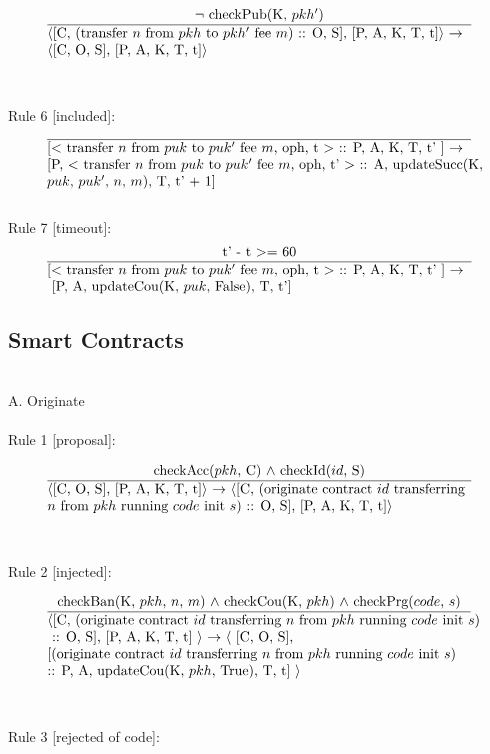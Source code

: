 \documentclass[a4paper]{llncs}
\begin{document}
\begin{equation}{}
\frac{\text{$\neg$ checkPub(K, $pkh'$)}}{\parbox{4.2in}{\text{$\langle$[C, (transfer $n$ from $pkh$ to $pkh'$ fee $m$) :: O, S], [P, A, K, T, t]$\rangle$ $\rightarrow$ }\\
\text{$\langle$[C, O, S], [P, A, K, T, t]$\rangle$}}} 
\end{equation}
\\
\\
Rule 6 [included]:
\begin{equation}{}
\frac{}{\parbox{4.2in}{\text{[$<$ transfer $n$ from $puk$ to  $puk'$ fee $m$, oph, t $>$ :: P, A, K, T, t' ] $\rightarrow$ } \\
 \text{[P, $<$ transfer $n$ from  $puk$ to $puk'$ fee $m$, oph, t' $>$ :: A, updateSucc(K, } \\
\text{$puk$, $puk'$, $n$, $m$), T, t' + 1]}}} 
\end{equation}
\\
Rule 7 [timeout]:
\begin{equation}{}
\frac{\text{t' - t $>=$ 60}}{\parbox{4.2in}{\text{[$<$ transfer $n$ from $puk$ to  $puk'$ fee $m$, oph, t $>$ :: P, A, K, T, t' ] $\rightarrow$} \\
 \hspace*{0cm} \text{[P, A, updateCou(K, $puk$, False), T, t']}}} 
\end{equation}

\subsection{Smart Contracts}
\\
A. Originate
\\
\\
Rule 1 [proposal]:

\begin{equation}{}
\frac{\text{checkAcc($pkh$, C) $\wedge$ checkId($id$, S)}}{\parbox{4.2in}{\text{$\langle$[C, O, S], [P, A, K, T, t]$\rangle$ $\rightarrow$ $\langle$[C, (originate contract ${id}$ transferring} \\
  \text{${n}$ from ${pkh}$} \text{running ${code}$ init ${s}$) :: O, S], [P, A, K, T, t]$\rangle$}}} 
\end{equation}
\\
\\
Rule 2 [injected]:

\begin{equation}{}
\frac{\text{checkBan(K, $pkh$, $n$, $m$) $\wedge$ checkCou(K, $pkh$) $\wedge$ \text{checkPrg($code$, $s$)}}}{\parbox{4.2in}{\text{$\langle$[C, (originate contract ${id}$ transferring  ${n}$ from ${pkh}$ running ${code}$ init ${s}$)} \text{ :: O, S], [P, A, K, T, t] $\rangle$ $\rightarrow$ $\langle$ [C, O, S],} \text{[(originate contract ${id}$ transferring ${n}$ from ${pkh}$ running ${code}$ init ${s}$)} \text{:: P, A, updateCou(K, $pkh$, True), T, t] $\rangle$}}} 
\end{equation}
\\
\\
Rule 3 [rejected of code]:
\end{document}
